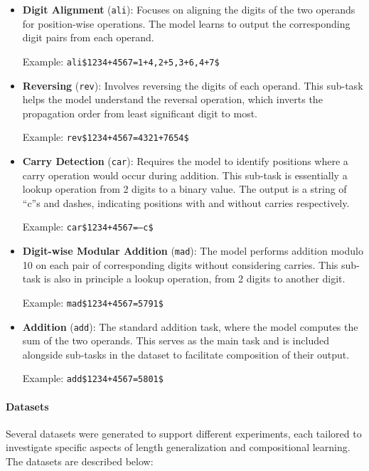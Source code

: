 \begin{itemize}
    \item \textbf{Digit Alignment} (\texttt{ali}): Focuses on aligning the digits of the two operands for position-wise operations. The model learns to output the corresponding digit pairs from each operand.

          Example: \texttt{ali\$1234+4567=1+4,2+5,3+6,4+7\$}

    \item \textbf{Reversing} (\texttt{rev}): Involves reversing the digits of each operand. This sub-task helps the model understand the reversal operation, which inverts the propagation order from least significant digit to most.

          Example: \texttt{rev\$1234+4567=4321+7654\$}

    \item \textbf{Carry Detection} (\texttt{car}): Requires the model to identify positions where a carry operation would occur during addition. This sub-task is essentially a lookup operation from 2 digits to a binary value. The output is a string of ``c''s and dashes, indicating positions with and without carries respectively.

          Example: \texttt{car\$1234+4567=---c\$}

    \item \textbf{Digit-wise Modular Addition} (\texttt{mad}): The model performs addition modulo 10 on each pair of corresponding digits without considering carries. This sub-task is also in principle a lookup operation, from 2 digits to another digit.

          Example: \texttt{mad\$1234+4567=5791\$}

    \item \textbf{Addition} (\texttt{add}): The standard addition task, where the model computes the sum of the two operands. This serves as the main task and is included alongside sub-tasks in the dataset to facilitate composition of their output.

          Example: \texttt{add\$1234+4567=5801\$}
\end{itemize}

\paragraph{Datasets}

Several datasets were generated to support different experiments, each tailored to investigate specific aspects of length generalization and compositional learning. The datasets are described below:

